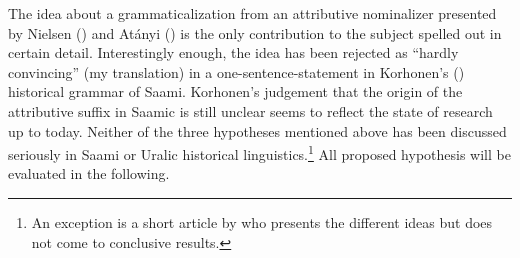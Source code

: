 {The idea about a grammaticalization from an attributive nominalizer presented by Nielsen (\citeyear{nielsen1933}) and Atányi (\citeyear{atanyi1942,atanyi1943}) is the only contribution to the subject spelled out in certain detail. Interestingly enough, the idea has been rejected as “hardly convincing” (my translation) in a one-sentence-statement in Korhonen's (\citeyear{korhonen-m1981}) historical grammar of Saami. Korhonen's judgement that the origin of the attributive suffix in Saamic is still unclear \citep[246]{korhonen-m1981} seems to reflect the state of research up to today. Neither of the three hypotheses mentioned above has been discussed seriously in Saami or Uralic historical linguistics.\footnote{An exception is a short article by \citet{sarv-m2001} who presents the different ideas but does not come to conclusive results.} All proposed hypothesis will be evaluated in the following.

}
